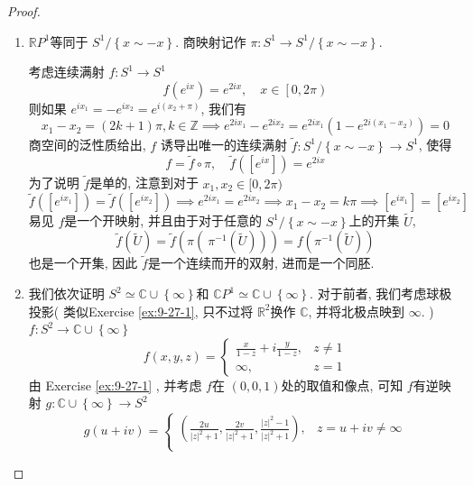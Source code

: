 \documentclass[../main.tex]{subfiles}
\begin{document}
\begin{proof}
   \begin{enumerate}
    \item  \(  \mathbb{R} P^{1}  \)等同于 \(  S^{1} / \left\{ x \sim -x \right\}  \).  商映射记作 \(   \pi: S^{1}\to S^{1}/ \left\{ x\sim -x \right\}  \). 

    考虑连续满射 \(  f:S^{1}\to S^{1}  \) \[
    f\left( e^{ix} \right)=  e^{ 2ix },\quad x \in \left[ 0,2 \pi\right)  
    \] 则如果 \(  e^{ix_1}= -e^{ix_2}= e^{i\left( x_2+  \pi \right) }  \), 我们有 \[
    x_1-x_2= \left( 2k+ 1 \right)  \pi ,  k \in \mathbb{Z} \implies e^{2ix_1}-e^{2ix_2}= e^{2ix_1}\left( 1-e^{2i\left( x_1-x_2 \right) } \right)=  0
    \] 商空间的泛性质给出, \(  f  \) 诱导出唯一的连续满射 \(  \tilde{f}: S^{1}/ \left\{ x\sim -x \right\}\to S^{1}  \), 使得 \[
  f= \tilde{f}\circ  \pi,\quad \tilde{f}\left( [e^{ix}] \right)= e^{2ix} 
    \] 为了说明 \(  \tilde{f}  \)是单的, 注意到对于 \(  x_1,x_2\in [0, 2 \pi)  \)  \[
    \tilde{f}\left( [e^{ix_1}] \right)= \tilde{f}\left( [e^{ix_2}] \right)\implies e^{2ix_1}= e^{2ix_2}\implies x_1-x_2= k \pi \implies [e^{ix_1}]= [e^{ix_2}]
    \] 易见 \(  f  \)是一个开映射, 并且由于对于任意的 \(  S^{1}/\left\{ x\sim -x \right\}  \)上的开集 \(  \tilde{U}  \),    \[
   \tilde{f}\left( \tilde{U} \right)= \tilde{f}\left(  \pi\left(  \ \pi ^{-1} \left( \tilde{U} \right)  \right)  \right)= f\left(  \pi ^{-1} \left( \tilde{U} \right)  \right)   
    \]也是一个开集, 因此 \(  \tilde{f}  \)是一个连续而开的双射, 进而是一个同胚. 
 \item 我们依次证明 \(  S^{2}\simeq \mathbb{C} \cup \left\{ \infty \right\}  \)和 \(  \mathbb{C} P^{1}\simeq \mathbb{C} \cup \left\{ \infty \right\}  \).  对于前者, 我们考虑球极投影( 类似Exercise \ref{ex:9-27-1}, 只不过将 \(  \mathbb{R} ^{2}  \)换作 \(  \mathbb{C}  \), 并将北极点映到 \(  \infty  \).    )\(  f: S^{2}\to \mathbb{C} \cup \left\{ \infty \right\}  \) \[
 f\left( x,y,z \right)= \begin{cases} \frac{x }{1-z } +  i \frac{y }{1-z } ,& z\neq 1\\ 
  \infty,&z= 1    \end{cases}  
 \] 由 Exercise \ref{ex:9-27-1} , 并考虑 \(  f  \)在 \(  \left( 0,0,1 \right)   \)处的取值和像点, 可知   \(  f  \)有逆映射  \(  g: \mathbb{C} \cup \left\{ \infty \right\}\to S^{2}  \) \[
 g\left( u+ iv\right)= \begin{cases} \left( \frac{2u }{\left| z\right|^{2} + 1  }, \frac{2v }{\left| z \right|^{2}+ 1  } , \frac{\left| z \right|^{2}-1  }{\left| z \right|^{2}+ 1  }   \right) , & z = u+ iv \neq \infty\\ 

\end{cases}\]
\end{enumerate}
\end{proof}
\end{document}
